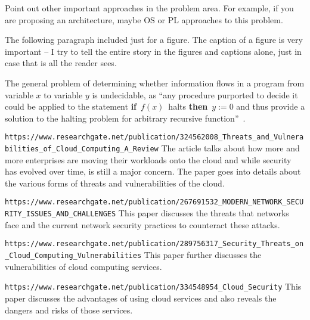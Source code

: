 Point out other important approaches in the problem area. For example, if you 
are proposing an architecture, maybe OS or PL approaches to this problem. 

The following paragraph included just for a figure. The caption of a figure is very
important -- I try to tell the entire story in the figures and captions alone, 
just in case that is all the reader sees.

The general problem of determining whether information flows in a program from
variable $x$ to variable $y$ is undecidable, as ``any procedure purported to
decide it could be applied to the statement {\bf if}~$f(x)$~halts {\bf then}~$y
:= 0$ and thus provide a solution to the halting problem for arbitrary
recursive function''~\cite{denning-impossible}.  

\verb|https://www.researchgate.net/publication/324562008_Threats_and_Vulnerabilities_of_Cloud_Computing_A_Review|
The article talks about how more and more enterprises are moving their workloads onto the cloud and while
security has evolved over time, is still a major concern. The paper goes into details about the various forms
of threats and vulnerabilities of the cloud.

\verb|https://www.researchgate.net/publication/267691532_MODERN_NETWORK_SECURITY_ISSUES_AND_CHALLENGES|
This paper discusses the threats that networks face and the current network security practices to counteract these attacks.

\verb|https://www.researchgate.net/publication/289756317_Security_Threats_on_Cloud_Computing_Vulnerabilities|
This paper further discusses the vulnerabilities of cloud computing services.

\verb|https://www.researchgate.net/publication/334548954_Cloud_Security|
This paper discusses the advantages of using cloud services and also reveals the dangers and risks of those services.
